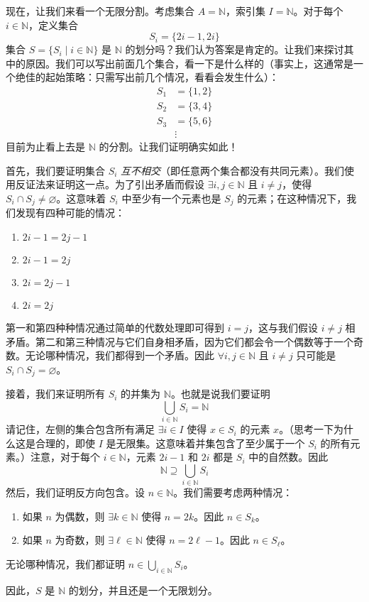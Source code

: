 \begin{example}
    现在，让我们来看一个无限分割。考虑集合 $A = \mathbb{N}$，索引集 $I = \mathbb{N}$。对于每个 $i \in \mathbb{N}$，定义集合
    \[S_i = \{2i - 1, 2i\}\]
    集合 $S = \{S_i \mid i \in \mathbb{N}\}$ 是 $\mathbb{N}$ 的划分吗？我们认为答案是肯定的。让我们来探讨其中的原因。我们可以写出前面几个集合，看一下是什么样的（事实上，这通常是一个绝佳的起始策略：只需写出前几个情况，看看会发生什么）：
    \begin{align*}
        S_1 & = \{1, 2\} \\
        S_2 & = \{3, 4\} \\
        S_3 & = \{5, 6\} \\
        &\vdots
    \end{align*}
    目前为止看上去是 $\mathbb{N}$ 的分割。让我们证明确实如此！

    首先，我们要证明集合 $S_i$ \emph{互不相交}（即任意两个集合都没有共同元素）。我们使用反证法来证明这一点。为了引出矛盾而假设 $\exists i, j \in \mathbb{N}$ 且 $i \ne j$，使得 $S_i \cap S_j \ne \varnothing$。这意味着 $S_i$ 中至少有一个元素也是 $S_j$ 的元素；在这种情况下，我们发现有四种可能的情况：
    \begin{enumerate}
        \item $2i - 1 = 2j - 1$
        \item $2i - 1 = 2j$
        \item $2i = 2j - 1$
        \item $2i = 2j$
    \end{enumerate}
    第一和第四种种情况通过简单的代数处理即可得到 $i = j$，这与我们假设 $i \ne j$ 相矛盾。第二和第三种情况与它们自身相矛盾，因为它们都会令一个偶数等于一个奇数。无论哪种情况，我们都得到一个矛盾。因此 $\forall i, j \in \mathbb{N}$ 且 $i \ne j$ 只可能是 $S_i \cap S_j = \varnothing$。

    接着，我们来证明所有 $S_i$ 的并集为 $\mathbb{N}$。也就是说我们要证明
    \[\bigcup_{i \in \mathbb{N}} S_i = \mathbb{N}\]
    请记住，左侧的集合包含所有满足 $\exists i \in I$ 使得 $x \in S_i$ 的元素 $x$。（思考一下为什么这是合理的，即使 $I$ 是无限集。这意味着并集包含了至少属于一个 $S_i$ 的所有元素。）注意，对于每个 $i \in \mathbb{N}$，元素 $2i - 1$ 和 $2i$ 都是 $S_i$ 中的自然数。因此
    \[\mathbb{N} \supseteq \bigcup_{i \in \mathbb{N}} S_i\]
    然后，我们证明反方向包含。设 $n \in \mathbb{N}$。我们需要考虑两种情况：
    \begin{enumerate}[label=(\arabic*)]
        \item 如果 $n$ 为偶数，则 $\exists k \in \mathbb{N}$ 使得 $n = 2k$。因此 $n \in S_k$。
        \item 如果 $n$ 为奇数，则 $\exists \ell \in \mathbb{N}$ 使得 $n = 2\ell-1$。因此 $n \in S_\ell$。
    \end{enumerate}
    无论哪种情况，我们都证明 $\displaystyle n \in \bigcup_{i \in \mathbb{N}} S_i$。

    因此，$S$ 是 $\mathbb{N}$ 的划分，并且还是一个无限划分。
\end{example}

